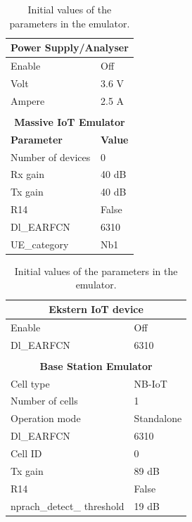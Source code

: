 \begin{table}[H]
\captionsetup{belowskip=0em}
\noindent
\centering
\begin{minipage}[t]{0.48\textwidth}
\begin{tabular}{|p{4cm}|p{2cm}|}
\hline
\multicolumn{2}{|c|}{\textbf{Power Supply/Analyser}}                         \\ \hline
Enable             & Off            \\ \hline
Volt               & 3.6 V          \\ \hline
Ampere             & 2.5 A          \\ \hline
\multicolumn{2}{c}{}\\ \hline
\multicolumn{2}{|c|}{\textbf{Massive IoT Emulator}}                          \\ \hline
\textbf{Parameter} & \textbf{Value} \\ \hline
Number of devices  & 0              \\ \hline
Rx gain            & 40 dB          \\ \hline
Tx gain            & 40 dB          \\ \hline
R14                & False          \\ \hline
Dl\_EARFCN         & 6310           \\ \hline
UE\_category       & Nb1            \\ \hline
\end{tabular}
\end{minipage}%
\hfill
\begin{minipage}[t]{0.48\textwidth}
\begin{tabular}{|p{4cm}|p{2cm}|}
\hline
\multicolumn{2}{|c|}{\textbf{Ekstern IoT device}}                            \\ \hline
Enable             & Off            \\ \hline
Dl\_EARFCN         & 6310           \\ \hline
\multicolumn{2}{c}{}\\ \hline
\multicolumn{2}{|c|}{\textbf{Base Station Emulator}}                         \\ \hline
Cell type          & NB-IoT         \\ \hline
Number of cells    & 1              \\ \hline
Operation mode     & Standalone     \\ \hline
Dl\_EARFCN         & 6310           \\ \hline
Cell ID            & 0              \\ \hline
Tx gain            & 89 dB          \\ \hline
R14                & False          \\ \hline
nprach\_detect\_ threshold  & 19 dB  \\ \hline
\end{tabular}
\end{minipage}
\caption{Initial values of the parameters in the emulator.}
\label{tab:setup_parameters}
\end{table}


